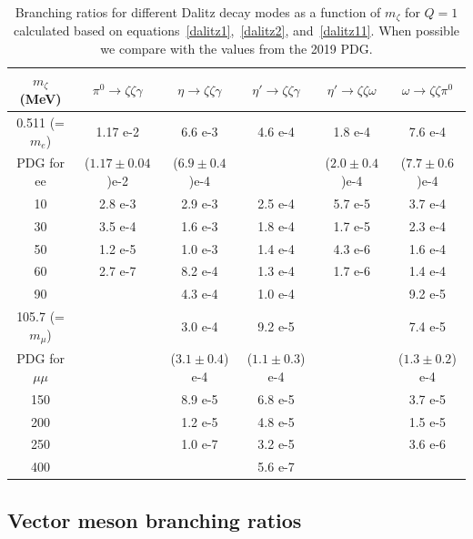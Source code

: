 \documentclass[12pt]{article}
\begin{document}
\begin{table}
  \begin{center}
    { \small
  \begin{tabular}{|c|c|c|c|c|c|}
    \hline
    $m_\zeta$ (MeV) & $\pi^0 \to \zeta \zeta \gamma$ & $\eta \to \zeta \zeta \gamma$
    & $\eta' \to \zeta \zeta \gamma$ & $\eta' \to \zeta \zeta \omega$
    & $\omega \to \zeta \zeta \pi^0$ \\ \hline \hline
  0.511 (=$m_e$)  & 1.17 e-2 & 6.6 e-3 & 4.6 e-4 & 1.8 e-4 & 7.6 e-4 \\
  PDG for ee  & ($1.17 \pm 0.04$)e-2 & ($6.9 \pm 0.4$)e-4 &   &
  ($2.0 \pm 0.4$)e-4  & ($7.7 \pm 0.6$)e-4 \\ \hline
  10              & 2.8 e-3  & 2.9 e-3 & 2.5 e-4 & 5.7 e-5 & 3.7 e-4 \\
  30              & 3.5 e-4  & 1.6 e-3 & 1.8 e-4 & 1.7 e-5 & 2.3 e-4 \\
  50              & 1.2 e-5  & 1.0 e-3 & 1.4 e-4 & 4.3 e-6 & 1.6 e-4 \\
  60              & 2.7 e-7  & 8.2 e-4 & 1.3 e-4 & 1.7 e-6 & 1.4 e-4 \\
  90              &         & 4.3 e-4 & 1.0 e-4 &        & 9.2 e-5 \\ \hline
  105.7 (=$m_\mu$)&         & 3.0 e-4 & 9.2 e-5 &         & 7.4 e-5 \\
  PDG for $\mu\mu$ &      & ($3.1 \pm 0.4$) e-4 & ($1.1 \pm 0.3$) e-4 & &
                      ($1.3 \pm 0.2$) e-4 \\ \hline
  150             &        & 8.9 e-5  & 6.8 e-5 &        & 3.7 e-5 \\
  200             &        & 1.2 e-5  & 4.8 e-5 &        & 1.5 e-5 \\
  250             &        & 1.0 e-7 & 3.2 e-5 &         & 3.6 e-6 \\
  400             &        &        & 5.6 e-7 &         &        \\ \hline 
  \end{tabular}
  }
  \caption{\protect Branching ratios for different Dalitz decay modes as
    a function of $m_\zeta$ for $Q=1$ calculated
    based on equations~\ref{dalitz1},~\ref{dalitz2}, and~\ref{dalitz11}.
When possible we compare with
  the values from the 2019 PDG.}
\label{tab:dalitz1}
  \end{center}
\end{table}

\subsection{Vector meson branching ratios}
\end{document}
